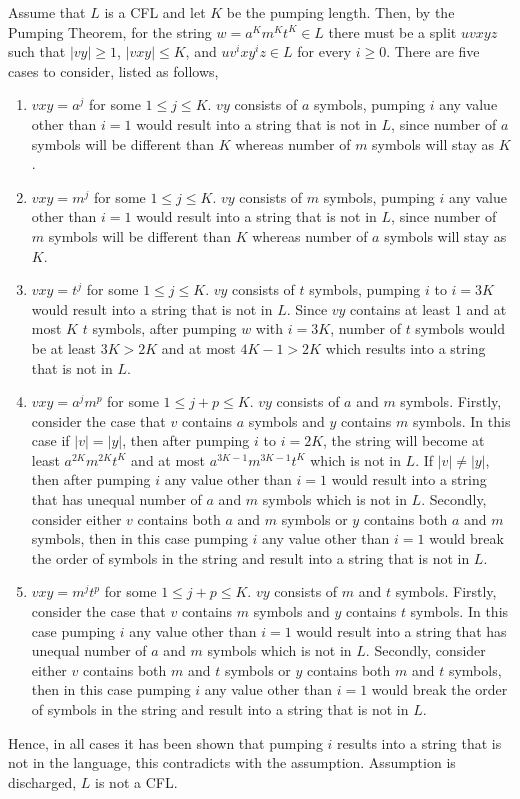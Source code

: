 \documentclass[a4paper,12pt]{article}
\begin{document}
\begin{tcolorbox}
Assume that $L$ is a CFL and let $K$ be the pumping length. Then, by the Pumping Theorem, for the string $w = a^Km^Kt^K \in L$ there must be a split $uvxyz$ such that $|vy| \geq 1$, $|vxy| \leq K$, and $uv^ixy^iz \in L$ for every $i \geq 0$. There are five cases to consider, listed as follows,
\begin{enumerate}
	\item $vxy = a^j$ for some $1 \leq j \leq K$. $vy$ consists of $a$ symbols, pumping $i$ any value other than $i = 1$ would result into a string that is not in $L$, since number of $a$ symbols will be different than $K$ whereas number of $m$ symbols will stay as $K$.
	\item $vxy = m^j$ for some $1 \leq j \leq K$. $vy$ consists of $m$ symbols, pumping $i$ any value other than $i = 1$ would result into a string that is not in $L$, since number of $m$ symbols will be different than $K$ whereas number of $a$ symbols will stay as $K$.
	\item $vxy = t^j$ for some $1 \leq j \leq K$. $vy$ consists of $t$ symbols, pumping $i$ to $i = 3K$ would result into a string that is not in $L$. Since $vy$ contains at least $1$ and at most $K$ $t$ symbols, after pumping $w$ with $i = 3K$, number of $t$ symbols would be at least $3K > 2K$ and at most $4K - 1 > 2K$ which results into a string that is not in $L$.
	\item $vxy = a^jm^p$ for some $1 \leq j + p \leq K$. $vy$ consists of $a$ and $m$ symbols. Firstly, consider the case that $v$ contains $a$ symbols and $y$ contains $m$ symbols. In this case if $|v| = |y|$, then after pumping $i$ to $i = 2K$, the string will become at least $a^{2K}m^{2K}t^K$ and at most $a^{3K - 1}m^{3K - 1}t^K$ which is not in $L$. If $|v| \neq |y|$, then after pumping $i$ any value other than $i = 1$ would result into a string that has unequal number of $a$ and $m$ symbols which is not in $L$. Secondly, consider either $v$ contains both $a$ and $m$ symbols or $y$ contains both $a$ and $m$ symbols, then in this case pumping $i$ any value other than $i = 1$ would break the order of symbols in the string and result into a string that is not in $L$.
	\item $vxy = m^jt^p$ for some $1 \leq j + p \leq K$. $vy$ consists of $m$ and $t$ symbols. Firstly, consider the case that $v$ contains $m$ symbols and $y$ contains $t$ symbols. In this case pumping $i$ any value other than $i = 1$ would result into a string that has unequal number of $a$ and $m$ symbols which is not in $L$. Secondly, consider either $v$ contains both $m$ and $t$ symbols or $y$ contains both $m$ and $t$ symbols, then in this case pumping $i$ any value other than $i = 1$ would break the order of symbols in the string and result into a string that is not in $L$.
\end{enumerate}
Hence, in all cases it has been shown that pumping $i$ results into a string that is not in the language, this contradicts with the assumption. Assumption is discharged, $L$ is not a CFL.
\end{tcolorbox}
\end{document}
